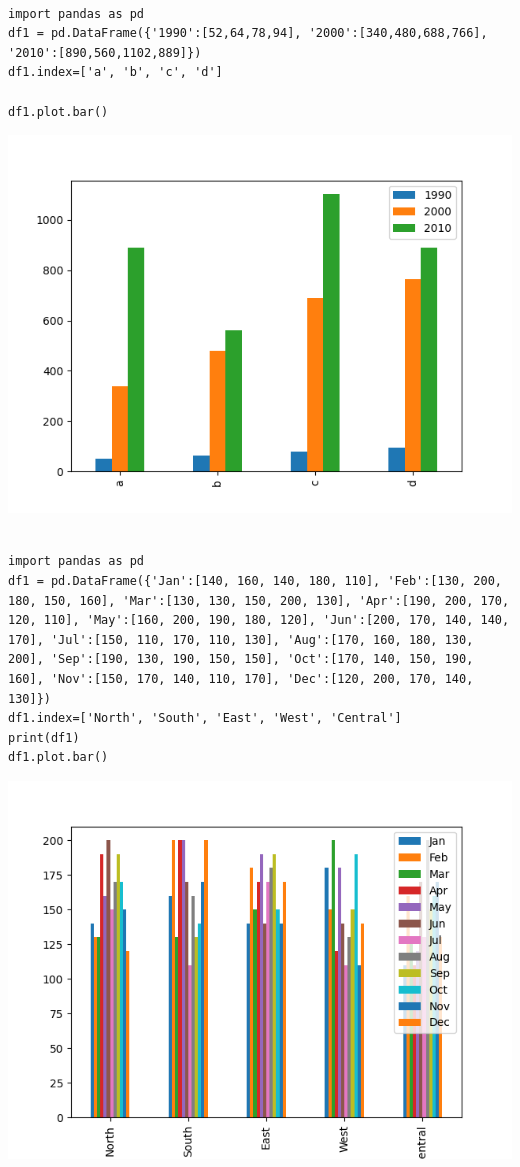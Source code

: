 \documentclass[11pt]{article}
\begin{document}
\newpage
\begin{verbatim}

import pandas as pd
df1 = pd.DataFrame({'1990':[52,64,78,94], '2000':[340,480,688,766], '2010':[890,560,1102,889]})
df1.index=['a', 'b', 'c', 'd']

df1.plot.bar()

\end{verbatim}

\begin{center}
\includegraphics[width=.9\linewidth]{fig10.png}
\end{center}

\newpage
\begin{verbatim}

import pandas as pd
df1 = pd.DataFrame({'Jan':[140, 160, 140, 180, 110], 'Feb':[130, 200, 180, 150, 160], 'Mar':[130, 130, 150, 200, 130], 'Apr':[190, 200, 170, 120, 110], 'May':[160, 200, 190, 180, 120], 'Jun':[200, 170, 140, 140, 170], 'Jul':[150, 110, 170, 110, 130], 'Aug':[170, 160, 180, 130, 200], 'Sep':[190, 130, 190, 150, 150], 'Oct':[170, 140, 150, 190, 160], 'Nov':[150, 170, 140, 110, 170], 'Dec':[120, 200, 170, 140, 130]})
df1.index=['North', 'South', 'East', 'West', 'Central']
print(df1)
df1.plot.bar()

\end{verbatim}

\begin{center}
\includegraphics[width=.9\linewidth]{fig11.png}
\end{center}
\end{document}
